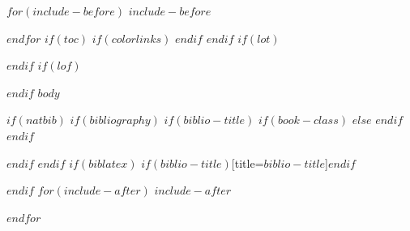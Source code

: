 \documentclass[$if(fontsize)$$fontsize$,$endif$$if(papersize)$twoside,$endif$$for(classoption)$$classoption$$sep$,$endfor$]{$documentclass$}
\begin{document}
$for(include-before)$
$include-before$

$endfor$
$if(toc)$
{
$if(colorlinks)$
\hypersetup{linkcolor=$if(toccolor)$$toccolor$$else$black$endif$}
$endif$
\setcounter{tocdepth}{$toc-depth$}
\tableofcontents
}
$endif$
$if(lot)$
\listoftables
$endif$
$if(lof)$
\listoffigures
$endif$
\mainmatter
$body$

\backmatter
$if(natbib)$
$if(bibliography)$
$if(biblio-title)$
$if(book-class)$
\renewcommand\bibname{$biblio-title$}
$else$
\renewcommand\refname{$biblio-title$}
$endif$
$endif$


$endif$
$endif$
$if(biblatex)$
\printbibliography$if(biblio-title)$[title=$biblio-title$]$endif$

$endif$
$for(include-after)$
$include-after$

$endfor$
\end{document}
